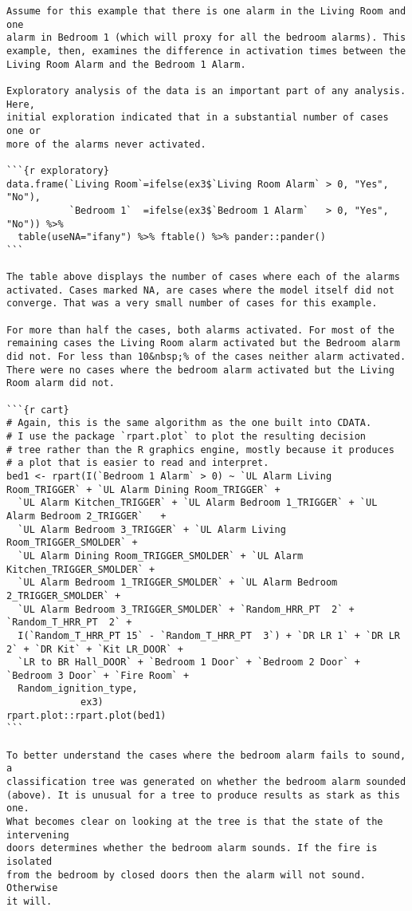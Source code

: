 \begin{lstlisting}[basicstyle=\scriptsize]
Assume for this example that there is one alarm in the Living Room and one
alarm in Bedroom 1 (which will proxy for all the bedroom alarms). This
example, then, examines the difference in activation times between the
Living Room Alarm and the Bedroom 1 Alarm.

Exploratory analysis of the data is an important part of any analysis. Here,
initial exploration indicated that in a substantial number of cases one or
more of the alarms never activated.

```{r exploratory}
data.frame(`Living Room`=ifelse(ex3$`Living Room Alarm` > 0, "Yes", "No"),
           `Bedroom 1`  =ifelse(ex3$`Bedroom 1 Alarm`   > 0, "Yes", "No")) %>%
  table(useNA="ifany") %>% ftable() %>% pander::pander()
```

The table above displays the number of cases where each of the alarms
activated. Cases marked NA, are cases where the model itself did not
converge. That was a very small number of cases for this example.

For more than half the cases, both alarms activated. For most of the
remaining cases the Living Room alarm activated but the Bedroom alarm
did not. For less than 10&nbsp;% of the cases neither alarm activated.
There were no cases where the bedroom alarm activated but the Living
Room alarm did not.

```{r cart}
# Again, this is the same algorithm as the one built into CDATA.
# I use the package `rpart.plot` to plot the resulting decision
# tree rather than the R graphics engine, mostly because it produces
# a plot that is easier to read and interpret.
bed1 <- rpart(I(`Bedroom 1 Alarm` > 0) ~ `UL Alarm Living Room_TRIGGER` + `UL Alarm Dining Room_TRIGGER` +
  `UL Alarm Kitchen_TRIGGER` + `UL Alarm Bedroom 1_TRIGGER` + `UL Alarm Bedroom 2_TRIGGER`   +
  `UL Alarm Bedroom 3_TRIGGER` + `UL Alarm Living Room_TRIGGER_SMOLDER` +
  `UL Alarm Dining Room_TRIGGER_SMOLDER` + `UL Alarm Kitchen_TRIGGER_SMOLDER` +
  `UL Alarm Bedroom 1_TRIGGER_SMOLDER` + `UL Alarm Bedroom 2_TRIGGER_SMOLDER` +
  `UL Alarm Bedroom 3_TRIGGER_SMOLDER` + `Random_HRR_PT  2` + `Random_T_HRR_PT  2` +
  I(`Random_T_HRR_PT 15` - `Random_T_HRR_PT  3`) + `DR LR 1` + `DR LR 2` + `DR Kit` + `Kit LR_DOOR` +
  `LR to BR Hall_DOOR` + `Bedroom 1 Door` + `Bedroom 2 Door` + `Bedroom 3 Door` + `Fire Room` +
  Random_ignition_type,
             ex3)
rpart.plot::rpart.plot(bed1)
```

To better understand the cases where the bedroom alarm fails to sound, a
classification tree was generated on whether the bedroom alarm sounded
(above). It is unusual for a tree to produce results as stark as this one.
What becomes clear on looking at the tree is that the state of the intervening
doors determines whether the bedroom alarm sounds. If the fire is isolated
from the bedroom by closed doors then the alarm will not sound. Otherwise
it will.


\end{lstlisting}
